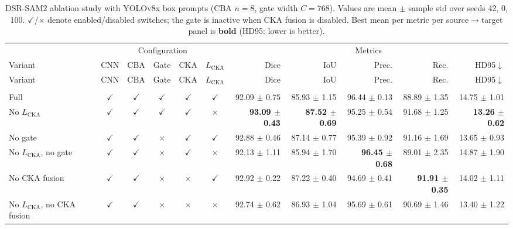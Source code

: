 \documentclass[10pt]{article}
\begin{document}
{\scriptsize
\setlength{\tabcolsep}{2pt}
\begin{longtable}{lccccc rrrrr}
\caption{DSR-SAM2 ablation study with YOLOv8x box prompts (CBA $n=8$, gate width $C=768$). Values are mean $\pm$ sample std over seeds 42, 0, 100. $\checkmark$/$\times$ denote enabled/disabled switches; the gate is inactive when CKA fusion is disabled. Best mean per metric per source$\rightarrow$target panel is \textbf{bold} (HD95: lower is better).}
\label{tab:ablation_dsr_sam2_yolov8x}\\
\toprule
& \multicolumn{5}{c}{Configuration} & \multicolumn{5}{c}{Metrics} \\
\cmidrule(lr){2-6}\cmidrule(lr){7-11}
Variant & CNN & CBA & Gate & CKA & $L_{\mathrm{CKA}}$ & Dice & IoU & Prec. & Rec. & HD95$\downarrow$ \\
\midrule
\endfirsthead
\toprule
Variant & CNN & CBA & Gate & CKA & $L_{\mathrm{CKA}}$ & Dice & IoU & Prec. & Rec. & HD95$\downarrow$ \\
\midrule
\endhead
\endfoot
\bottomrule
\endlastfoot
\multicolumn{11}{l}{\textit{Source: OTU $\rightarrow$ Target: OVATUS}} \\
\midrule
Full & $\checkmark$ & $\checkmark$ & $\checkmark$ & $\checkmark$ & $\checkmark$ & 92.09 $\pm$ 0.75 & 85.93 $\pm$ 1.15 & 96.44 $\pm$ 0.13 & 88.89 $\pm$ 1.35 & 14.75 $\pm$ 1.01 \\
No $L_{\mathrm{CKA}}$ & $\checkmark$ & $\checkmark$ & $\checkmark$ & $\checkmark$ & $\times$ & \textbf{93.09 $\pm$ 0.43} & \textbf{87.52 $\pm$ 0.69} & 95.25 $\pm$ 0.54 & 91.68 $\pm$ 1.25 & \textbf{13.26 $\pm$ 0.62} \\
No gate & $\checkmark$ & $\checkmark$ & $\times$ & $\checkmark$ & $\checkmark$ & 92.88 $\pm$ 0.46 & 87.14 $\pm$ 0.77 & 95.39 $\pm$ 0.92 & 91.16 $\pm$ 1.69 & 13.65 $\pm$ 0.93 \\
No $L_{\mathrm{CKA}}$, no gate & $\checkmark$ & $\checkmark$ & $\times$ & $\checkmark$ & $\times$ & 92.13 $\pm$ 1.11 & 85.94 $\pm$ 1.70 & \textbf{96.45 $\pm$ 0.68} & 89.01 $\pm$ 2.35 & 14.87 $\pm$ 1.90 \\
No CKA fusion & $\checkmark$ & $\checkmark$ & $\times$ & $\times$ & $\checkmark$ & 92.92 $\pm$ 0.22 & 87.22 $\pm$ 0.40 & 94.69 $\pm$ 0.41 & \textbf{91.91 $\pm$ 0.35} & 14.02 $\pm$ 1.11 \\
No $L_{\mathrm{CKA}}$, no CKA fusion & $\checkmark$ & $\checkmark$ & $\times$ & $\times$ & $\times$ & 92.74 $\pm$ 0.62 & 86.93 $\pm$ 1.04 & 95.69 $\pm$ 0.61 & 90.69 $\pm$ 1.46 & 13.40 $\pm$ 1.22 \\

\end{longtable}}
\end{document}
